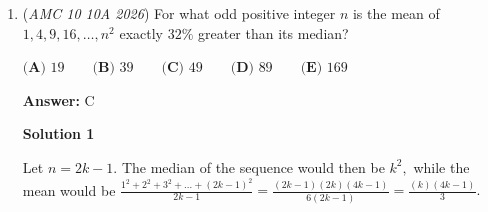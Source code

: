 \begin{enumerate}
 $\textbf{(A)} 12 \qquad \textbf{(B)} 14 \qquad \textbf{(C)} 15 \qquad \textbf{(D)} 16 \qquad \textbf{(E)} 17$

 \textbf{Answer: }D



\textbf{Solution 1}

First of all, the longest leg of the smaller triangle must be 12. The medium leg should be 9. For the larger triangle, the smallest leg is 9 and the medium leg is 12. The ratio between the mediums is $\frac{12}{9} = \frac{4}{3}$, hence the largest side must be $12 \cdot \frac{4}{3} = \boxed{16}$. 

 



\textbf{Solution 2}

We can make the side lengths of the smaller triangle $a$, $b$, and $c$, with $a<b<c$. We also make the side lengths of the larger triangle $x$, $y$, and $z$, with $x<y<z$. We already know that $b=9$ and $c=12$ and that $x=9$ and $y=12$. With this, we can see that the ratio of the side lengths of the larger triangle over the side lengths of the smaller triangle is $\frac{12}{9} = \frac{4}{3}$. We can then say that $z$, or the longest side of the larger triangle's length, is $12 \cdot \frac{4}{3} = \boxed{16}$.

 



\textbf{Solution 3}

The side lengths of the small triangle are $a, 9, 12$ and the large triangle has side lengths $9, 12, b$. The two triangles are similar, so $\frac{9}{12}=\frac{12}{b}$. Solving gives $b=16$.~BOTNATE

 


 


	\item (\textit{AMC 10 10A 2026}) For what odd positive integer $n$ is the mean of $1, 4, 9, 16, \dots, n^2$ exactly $32\%$ greater than its median?


 $\textbf{(A) } 19 \qquad\textbf{(B) } 39 \qquad\textbf{(C) } 49 \qquad\textbf{(D) } 89 \qquad\textbf{(E) } 169$

 \textbf{Answer: }C



\textbf{Solution 1}

Let $n=2k-1.$ The median of the sequence would then be $k^2,$ while the mean would be $\frac{1^2+2^2+3^2+...+(2k-1)^2}{2k-1}=\frac{(2k-1)(2k)(4k-1)}{6(2k-1)}=\frac{(k)(4k-1)}{3}.$ 


\end{enumerate}
